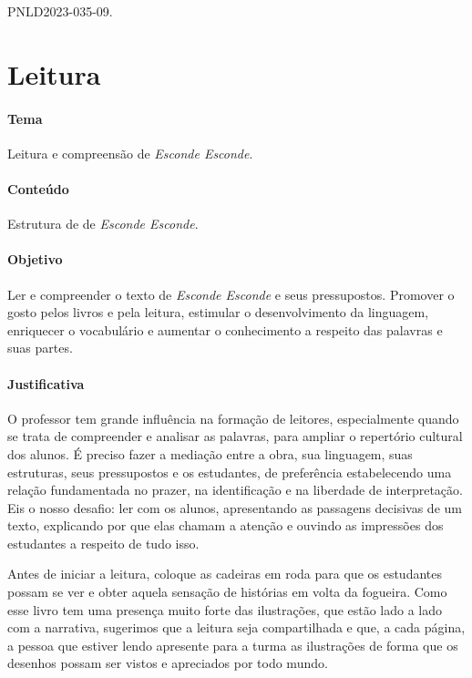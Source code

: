 \documentclass[11pt]{extarticle}
\begin{document}
PNLD2023-035-09.

\section{Leitura}


\paragraph{Tema} Leitura e compreensão de \textit{Esconde Esconde}.

\paragraph{Conteúdo} Estrutura de de \textit{Esconde Esconde}.  

\paragraph{Objetivo} Ler e compreender o texto de \textit{Esconde Esconde} e seus pressupostos. Promover o gosto pelos livros e pela leitura, estimular o desenvolvimento da linguagem, enriquecer o vocabulário e aumentar o conhecimento a respeito das palavras e suas partes.   

\paragraph{Justificativa} O professor tem grande influência na formação de leitores, especialmente quando se trata de compreender e analisar as palavras, para ampliar o repertório cultural dos alunos. É preciso fazer a mediação entre a obra, sua linguagem, suas estruturas, seus pressupostos e os estudantes, de preferência estabelecendo uma relação fundamentada no prazer, na identificação e na liberdade de interpretação. Eis o nosso desafio: ler com os alunos, apresentando as passagens decisivas de um texto, explicando por que elas chamam a atenção e  ouvindo as impressões dos estudantes a respeito de tudo isso.  

Antes de iniciar a leitura, coloque as cadeiras em roda para que os estudantes possam se ver e obter aquela sensação de histórias em volta da fogueira. Como esse livro tem uma presença muito forte das ilustrações, que estão lado a lado com a narrativa, sugerimos que a leitura seja compartilhada e que, a cada página, a pessoa que estiver lendo apresente para a turma as ilustrações de forma que os desenhos possam ser vistos e apreciados por todo mundo. 
\end{document}
